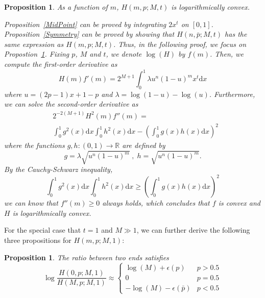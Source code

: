 \documentclass{article}
\makeatletter
\newtheorem{proposition}[theorem]{Proposition}
\renewenvironment{proof}[1][\proofname]{\par
  \vspace{-\topsep}%
  \pushQED{\qed}%
  \normalfont
  \topsep0pt \partopsep0pt %
  \trivlist
  \item[\hskip\labelsep
        \itshape
    #1\@addpunct{.}]\ignorespaces
}{%
  \popQED\endtrivlist\@endpefalse
  \addvspace{0pt plus 0pt} %
}
\makeatother
\begin{document}
\begin{proposition}
\label{LogConvexity}
As a function of $m$, $H(m,p;M,t)$ is logarithmically convex.
\begin{proof}
Proposition~\ref{MidPoint} can be proved by integrating $2 x^t$ on $[0,1]$.
Proposition~\ref{Symmetry} can be proved by showing that $H(n, \bar{p};M,t)$ has the same expression as $H(m,p;M,t)$.
Thus, in the following proof, we focus on Propostion~\ref{LogConvexity}. Fixing $p$, $M$ and $t$, we denote $\log (H)$ by $f(m)$. Then, we compute the first-order derivative as
\begin{equation}
H(m)f'(m)=2^{M+1}\int_{0}^{1}\lambda u^{n}(1-u)^{m}x^t\mathrm{d}x
\end{equation}
where $u= (2p-1)x+1-p$ and $\lambda=\log(1-u)-\log(u)$. Furthermore, we can solve the second-order derivative as
\begin{equation}
\begin{split}
&2^{-2(M+1)}H^2(m)f''(m)=\\
&\int_{0}^{1}g^2(x)\mathrm{d}x\int_{0}^{1}h^2(x)\mathrm{d}x-\left(\int_{0}^{1}g(x)h(x)\mathrm{d}x\right)^2
\end{split}
\end{equation}
where the functions $g,h:(0,1)\rightarrow  \mathbb{R}$ are defined by
\begin{equation}
g=\lambda\sqrt{u^{n}(1-u)^{m}}\;, \; h = \sqrt{u^{n}(1-u)^{m}}.
\end{equation}
By the Cauchy-Schwarz inequality,
\begin{equation}
\int_{0}^{1}g^2(x)\mathrm{d}x\int_{0}^{1}h^2(x)\mathrm{d}x\geq \left(\int_{0}^{1}g(x)h(x)\mathrm{d}x\right)^2
\end{equation}
we can know that $f''(m)\geq 0$ always holds, which concludes that $f$ is convex and $H$ is logarithmically convex.
\end{proof}
\end{proposition}
For the special case that $t=1$ and $M\gg 1$, we can further derive the following three propositions for $H(m,p;M,1)$:
\begin{proposition}
\label{Ratio1}
The ratio between two ends satisfies
$$\log\frac{H(0,p;M,1)}{H(M,p;M,1)} \approx \left\{
    \begin{array}{cl}
    \log(M)+\epsilon(p) & p>0.5\\
    0 & p=0.5\\
    -\log(M)-\epsilon(\bar{p}) & p<0.5
    \end{array}\right.$$
\end{proposition}
\end{document}
